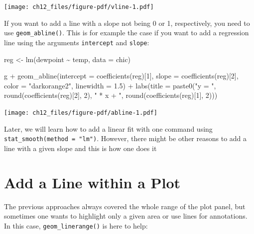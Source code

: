 \documentclass[
  letterpaper,
  DIV=11,
  numbers=noendperiod]{scrreprt}
\newenvironment{Shaded}{\begin{snugshade}}{\end{snugshade}}
\newcommand{\AttributeTok}[1]{\textcolor[rgb]{0.40,0.45,0.13}{#1}}
\newcommand{\DecValTok}[1]{\textcolor[rgb]{0.68,0.00,0.00}{#1}}
\newcommand{\FloatTok}[1]{\textcolor[rgb]{0.68,0.00,0.00}{#1}}
\newcommand{\FunctionTok}[1]{\textcolor[rgb]{0.28,0.35,0.67}{#1}}
\newcommand{\NormalTok}[1]{\textcolor[rgb]{0.00,0.23,0.31}{#1}}
\newcommand{\OtherTok}[1]{\textcolor[rgb]{0.00,0.23,0.31}{#1}}
\newcommand{\SpecialCharTok}[1]{\textcolor[rgb]{0.37,0.37,0.37}{#1}}
\newcommand{\StringTok}[1]{\textcolor[rgb]{0.13,0.47,0.30}{#1}}
\begin{document}
\texttt{[image: ch12\_files/figure-pdf/vline-1.pdf]}

If you want to add a line with a slope not being 0 or 1, respectively,
you need to use \texttt{geom\_abline()}. This is for example the case if
you want to add a regression line using the arguments \texttt{intercept}
and \texttt{slope}:

\begin{Shaded}
\begin{Highlighting}[]
\NormalTok{reg }\OtherTok{\textless{}{-}} \FunctionTok{lm}\NormalTok{(dewpoint }\SpecialCharTok{\textasciitilde{}}\NormalTok{ temp, }\AttributeTok{data =}\NormalTok{ chic)}

\NormalTok{g }\SpecialCharTok{+}
  \FunctionTok{geom\_abline}\NormalTok{(}\AttributeTok{intercept =} \FunctionTok{coefficients}\NormalTok{(reg)[}\DecValTok{1}\NormalTok{],}
              \AttributeTok{slope =} \FunctionTok{coefficients}\NormalTok{(reg)[}\DecValTok{2}\NormalTok{],}
              \AttributeTok{color =} \StringTok{"darkorange2"}\NormalTok{, }
              \AttributeTok{linewidth =} \FloatTok{1.5}\NormalTok{) }\SpecialCharTok{+}
  \FunctionTok{labs}\NormalTok{(}\AttributeTok{title =} \FunctionTok{paste0}\NormalTok{(}\StringTok{"y = "}\NormalTok{, }\FunctionTok{round}\NormalTok{(}\FunctionTok{coefficients}\NormalTok{(reg)[}\DecValTok{2}\NormalTok{], }\DecValTok{2}\NormalTok{),}
                      \StringTok{" * x + "}\NormalTok{, }\FunctionTok{round}\NormalTok{(}\FunctionTok{coefficients}\NormalTok{(reg)[}\DecValTok{1}\NormalTok{], }\DecValTok{2}\NormalTok{)))}
\end{Highlighting}
\end{Shaded}

\texttt{[image: ch12\_files/figure-pdf/abline-1.pdf]}

Later, we will learn how to add a linear fit with one command using
\texttt{stat\_smooth(method\ =\ "lm")}. However, there might be other
reasons to add a line with a given slope and this is how one does it 🤷

\section{Add a Line within a Plot}\label{add-a-line-within-a-plot}

The previous approaches always covered the whole range of the plot
panel, but sometimes one wants to highlight only a given area or use
lines for annotations. In this case, \texttt{geom\_linerange()} is here
to help:
\end{document}
